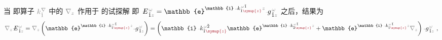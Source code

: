 当  即算子 $\mathcolor{gray}{k^\nabla_{\check{1}}}$ 中的 $\mathcolor{gray}{\nabla_z}$ 作用于  的试探解  即 $
\xint{\mathcolor{gray}{-}}{25}{E}^{\;\!\mathcolor{gray}{\omega}}_{\;\! \hat{1} \mathcolor{gray}{z}} = \mathbb{e}^{\mathbb{i} \xint{\begin{smallmatrix} ~ \\ {}^{}_{\mathcolor{gray}{-}} \\ ~ \end{smallmatrix}}{15}{k}_{\hat{1} \textcolor{Maroon}{\symup{z}}}^{\;\! \mathcolor{gray}{\omega} \breve{1}} \mathcolor{gray}{z}} \xint{{}^{}_{\mathcolor{gray}{-}}}{10}{g}^{\;\!\mathcolor{gray}{\omega}}_{\;\! \breve{1} \mathcolor{gray}{z}}$ 之后，结果为
\begin{align} \label{eq:matrix_exp-dz}
	\mathcolor{gray}{\nabla_z} \xint{\mathcolor{gray}{-}}{30}{E}^{\;\!\mathcolor{gray}{\omega}}_{\;\! \hat{1} \mathcolor{gray}{z}} = \mathcolor{gray}{\nabla_z} \left( \mathbb{e}^{\mathbb{i} \xint{\begin{smallmatrix} ~ \\ {}^{}_{\mathcolor{gray}{-}} \\ ~ \end{smallmatrix}}{15}{k}_{\hat{1} \textcolor{Maroon}{\symup{z}}}^{\;\! \mathcolor{gray}{\omega} \breve{1}} \mathcolor{gray}{z}} \xint{{}^{}_{\mathcolor{gray}{-}}}{10}{g}^{\;\!\mathcolor{gray}{\omega}}_{\;\! \breve{1} \mathcolor{gray}{z}} \right) = \left( \mathbb{i} \xint{\begin{smallmatrix} ~ \\ {}^{}_{\mathcolor{gray}{-}} \\ ~ \end{smallmatrix}}{15}{k}_{\hat{1} \textcolor{Maroon}{\symup{z}}}^{\;\! \mathcolor{gray}{\omega} \breve{2}} \mathbb{e}^{\mathbb{i} \xint{\begin{smallmatrix} ~ \\ {}^{}_{\mathcolor{gray}{-}} \\ ~ \end{smallmatrix}}{15}{k}_{\breve{2} \textcolor{Maroon}{\symup{z}}}^{\;\! \mathcolor{gray}{\omega} \breve{1}} \mathcolor{gray}{z}} + \mathbb{e}^{\mathbb{i} \xint{\begin{smallmatrix} ~ \\ {}^{}_{\mathcolor{gray}{-}} \\ ~ \end{smallmatrix}}{15}{k}_{\hat{1} \textcolor{Maroon}{\symup{z}}}^{\;\! \mathcolor{gray}{\omega} \breve{1}} \mathcolor{gray}{z}} \mathcolor{gray}{\nabla_z} \right) \xint{{}^{}_{\mathcolor{gray}{-}}}{10}{g}^{\;\!\mathcolor{gray}{\omega}}_{\;\! \breve{1} \mathcolor{gray}{z}} ~,
\end{align}
